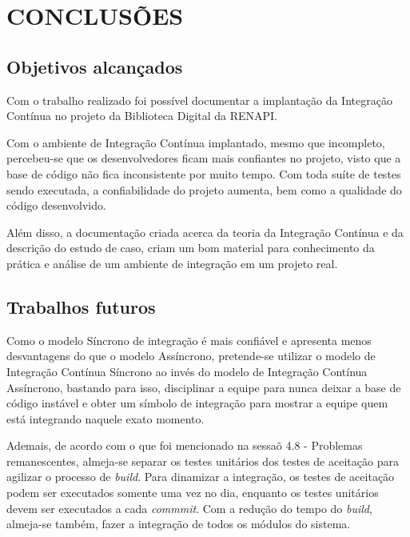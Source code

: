 \chapter{CONCLUSÕES}

\section{Objetivos alcançados}

Com o trabalho realizado foi possível documentar a implantação da Integração Contínua no projeto da Biblioteca Digital da RENAPI.

Com o ambiente de Integração Contínua implantado, mesmo que incompleto, percebeu-se que os desenvolvedores ficam mais confiantes no projeto, visto que a base de código não fica inconsistente por muito tempo. Com toda suíte de testes sendo executada, a confiabilidade do projeto aumenta, bem como a qualidade do código desenvolvido.

Além disso, a documentação criada acerca da teoria da Integração Contínua e da descrição do estudo de caso, criam um bom material para conhecimento da prática e análise de um ambiente de integração em um projeto real.

\section{Trabalhos futuros}

Como o modelo Síncrono de integração é mais confiável e apresenta menos desvantagens do que o modelo Assíncrono, pretende-se utilizar o modelo de Integração Contínua Síncrono ao invés do modelo de Integração Contínua Assíncrono, bastando para isso, disciplinar a equipe para nunca deixar a base de código instável e obter um símbolo de integração para mostrar a equipe quem está integrando naquele exato momento.

Ademais, de acordo com o que foi mencionado na sessaõ 4.8 - Problemas remanescentes, almeja-se separar os testes unitários dos testes de aceitação para agilizar o processo de \textit{build}. Para dinamizar a integração, os testes de aceitação podem ser executados somente uma vez no dia, enquanto os testes unitários devem ser executados a cada \textit{commmit}. Com a redução do tempo do \textit{build}, almeja-se também, fazer a integração de todos os módulos do sistema.


